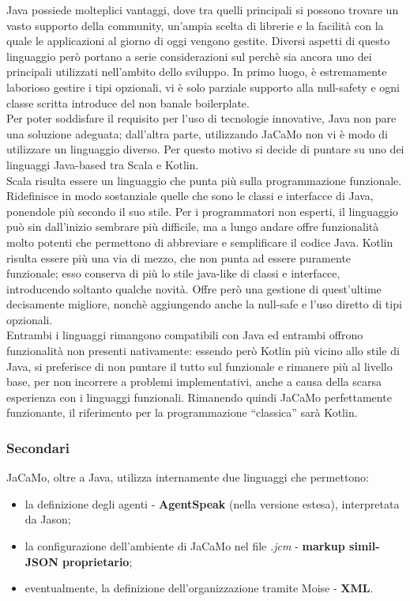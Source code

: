 \documentclass[12pt,a4paper,openright,oneside]{report}
\newcommand{\quotes}[1]{``#1''}
\begin{document}
Java possiede molteplici vantaggi, dove tra quelli principali si possono trovare un vasto supporto della community, un'ampia scelta di librerie e la facilità con la quale le applicazioni al giorno di oggi vengono gestite. Diversi aspetti di questo linguaggio però portano a serie considerazioni sul perchè sia ancora uno dei principali utilizzati nell'ambito dello sviluppo. In primo luogo, è estremamente laborioso gestire i tipi opzionali, vi è solo parziale supporto alla null-safety e ogni classe scritta introduce del non banale boilerplate.\\

Per poter soddisfare il requisito per l'uso di tecnologie innovative, Java non pare una soluzione adeguata; dall'altra parte, utilizzando JaCaMo non vi è modo di utilizzare un linguaggio diverso. Per questo motivo si decide di puntare su uno dei linguaggi Java-based tra Scala e Kotlin.\\

Scala risulta essere un linguaggio che punta più sulla programmazione funzionale. Ridefinisce in modo sostanziale quelle che sono le classi e interfacce di Java, ponendole più secondo il suo stile. Per i programmatori non esperti, il linguaggio può sin dall'inizio sembrare più difficile, ma a lungo andare offre funzionalità molto potenti che permettono di abbreviare e semplificare il codice Java. Kotlin risulta essere più una via di mezzo, che non punta ad essere puramente funzionale; esso conserva di più lo stile java-like di classi e interfacce, introducendo soltanto qualche novità. Offre però una gestione di quest'ultime decisamente migliore, nonchè aggiungendo anche la null-safe e l'uso diretto di tipi opzionali.\\

Entrambi i linguaggi rimangono compatibili con Java ed entrambi offrono funzionalità non presenti nativamente: essendo però Kotlin più vicino allo stile di Java, si preferisce di non puntare il tutto sul funzionale e rimanere più al livello base, per non incorrere a problemi implementativi, anche a causa della scarsa esperienza con i linguaggi funzionali. Rimanendo quindi JaCaMo perfettamente funzionante, il riferimento per la programmazione \quotes{classica} sarà Kotlin.

\subsubsection{Secondari}
JaCaMo, oltre a Java, utilizza internamente due linguaggi che permettono:
\begin{itemize}
	\item la definizione degli agenti - \textbf{AgentSpeak} (nella versione estesa), interpretata da Jason;
	\item la configurazione dell'ambiente di JaCaMo nel file \textit{.jcm} - \textbf{markup simil-JSON proprietario};
	\item eventualmente, la definizione dell'organizzazione tramite Moise - \textbf{XML}.
\end{itemize}
 
\end{document}
